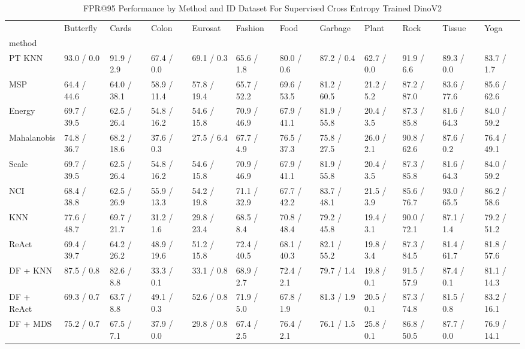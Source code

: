\documentclass[letterpaper]{article} %
\theoremstyle{plain}
\theoremstyle{definition}
\theoremstyle{remark}
\begin{document}
\begin{table}
\caption{FPR@95 Performance by Method and ID Dataset For Supervised Cross Entropy Trained DinoV2}


\label{tab:fpr95_results_dino}

\begin{tabular}{llllllllllll}
\toprule
 & Butterfly & Cards & Colon & Eurosat & Fashion & Food & Garbage & Plant & Rock & Tissue & Yoga \\
method &  &  &  &  &  &  &  &  &  &  &  \\
\midrule
PT KNN & 93.0 / 0.0 & 91.9 / 2.9 & 67.4 / 0.0 & 69.1 / 0.3 & 65.6 / 1.8 & 80.0 / 0.6 & 87.2 / 0.4 & 62.7 / 0.0 & 91.9 / 6.6 & 89.3 / 0.0 & 83.7 / 1.7 \\
MSP & 64.4 / 44.6 & 64.0 / 38.1 & 58.9 / 11.4 & 57.8 / 19.4 & 65.7 / 52.2 & 69.6 / 53.5 & 81.2 / 60.5 & 21.2 / 5.2 & 87.2 / 87.0 & 83.6 / 77.6 & 85.6 / 62.6 \\
Energy & 69.7 / 39.5 & 62.5 / 26.4 & 54.8 / 16.2 & 54.6 / 15.8 & 70.9 / 46.9 & 67.9 / 41.1 & 81.9 / 55.8 & 20.4 / 3.5 & 87.3 / 85.8 & 81.6 / 64.3 & 84.0 / 59.2 \\
Mahalanobis & 74.8 / 36.7 & 68.2 / 18.6 & 37.6 / 0.3 & 27.5 / 6.4 & 67.7 / 4.9 & 76.5 / 37.3 & 75.8 / 27.5 & 26.0 / 2.1 & 90.8 / 62.6 & 87.6 / 0.2 & 76.4 / 49.1 \\
Scale & 69.7 / 39.5 & 62.5 / 26.4 & 54.8 / 16.2 & 54.6 / 15.8 & 70.9 / 46.9 & 67.9 / 41.1 & 81.9 / 55.8 & 20.4 / 3.5 & 87.3 / 85.8 & 81.6 / 64.3 & 84.0 / 59.2 \\
NCI & 68.4 / 38.8 & 62.5 / 26.9 & 55.9 / 13.3 & 54.2 / 19.8 & 71.1 / 32.9 & 67.7 / 42.2 & 83.7 / 48.1 & 21.5 / 3.9 & 85.6 / 76.7 & 93.0 / 65.5 & 86.2 / 58.6 \\
KNN & 77.6 / 48.7 & 69.7 / 21.7 & 31.2 / 1.6 & 29.8 / 23.4 & 68.5 / 8.4 & 70.8 / 48.4 & 79.2 / 45.8 & 19.4 / 3.1 & 90.0 / 72.1 & 87.1 / 1.4 & 79.2 / 51.2 \\
ReAct & 69.4 / 39.7 & 64.2 / 26.2 & 48.9 / 19.6 & 51.2 / 15.8 & 72.4 / 40.5 & 68.1 / 40.3 & 82.1 / 55.2 & 19.8 / 3.4 & 87.3 / 84.5 & 81.4 / 61.7 & 81.8 / 57.6 \\
DF + KNN & 87.5 / 0.8 & 82.6 / 8.8 & 33.3 / 0.1 & 33.1 / 0.8 & 68.9 / 2.7 & 72.4 / 2.1 & 79.7 / 1.4 & 19.8 / 0.1 & 91.5 / 57.9 & 87.4 / 0.1 & 81.1 / 14.3 \\
DF + ReAct & 69.3 / 0.7 & 63.7 / 8.8 & 49.1 / 0.3 & 52.6 / 0.8 & 71.9 / 5.0 & 67.8 / 1.9 & 81.3 / 1.9 & 20.5 / 0.1 & 87.3 / 74.8 & 81.5 / 0.8 & 83.2 / 16.1 \\
DF + MDS & 75.2 / 0.7 & 67.5 / 7.1 & 37.9 / 0.0 & 29.8 / 0.8 & 67.4 / 2.5 & 76.4 / 2.1 & 76.1 / 1.5 & 25.8 / 0.1 & 86.8 / 50.5 & 87.7 / 0.0 & 76.9 / 14.1 \\
\bottomrule
\end{tabular}

\end{table}
\end{document}

